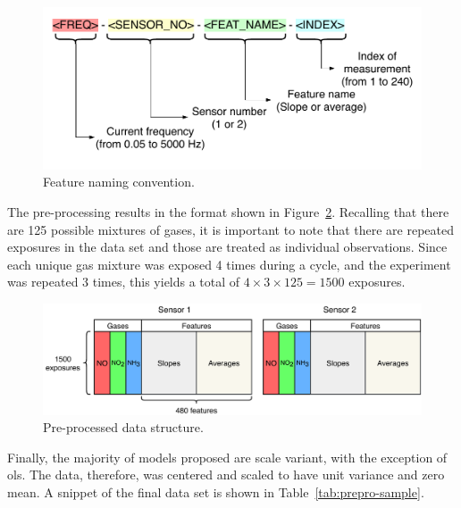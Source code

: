 \begin{figure}[h]
	\centering
	\includegraphics[width=1\textwidth]{../figures/feat-naming.pdf}
	\caption{Feature naming convention.}
	\label{fig:feat-naming}
\end{figure}

The pre-processing results in the format shown in Figure~\ref{fig:preprocessed-data}. Recalling that there are 125 possible mixtures of gases, it is important to note that there are repeated exposures in the data set and those are treated as individual observations. Since each unique gas mixture was exposed 4 times during a cycle, and the experiment was repeated 3 times, this yields a total of $4 \times 3 \times 125 = 1500$ exposures.

\begin{figure}[h]
	\centering
	\includegraphics[width=1\textwidth]{../figures/preprocessed-data.pdf}
	\caption{Pre-processed data structure.}
	\label{fig:preprocessed-data}
\end{figure}

Finally, the majority of models proposed are scale variant, with the exception of \acrshort{ols}. The data, therefore, was centered and scaled to have unit variance and zero mean. A snippet of the final data set is shown in Table~\ref{tab:prepro-sample}.


